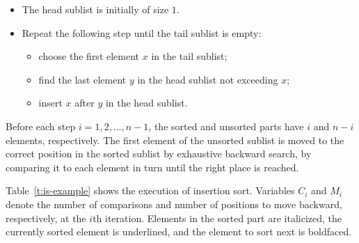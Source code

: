 \begin{itemize}
\item The head sublist is initially of size $1$. 
\item Repeat the following step until the tail sublist is empty:
\begin{itemize}
\item choose the first element $x$ in the tail sublist;
\item find the last element $y$ in the head sublist not exceeding $x$;
\item insert $x$ after $y$ in the head sublist.
\end{itemize}
\end{itemize}

Before each step $i=1, 2, \ldots, n-1$, the sorted and unsorted parts have $i$ 
and $n-i$ elements, respectively. The first element of the unsorted sublist is
moved to the correct position in the sorted sublist by exhaustive backward search,
by comparing it to each element in turn until the right place is reached. 

\begin{Example}
Table~\ref{t:is-example} shows the execution of insertion sort.
Variables $C_i$ and $M_i$ denote the number of comparisons and number of positions 
to move backward, respectively, at the $i$th iteration. Elements in the sorted 
part are italicized, the currently sorted element is underlined, and the element to 
sort next is boldfaced.
\end{Example}

